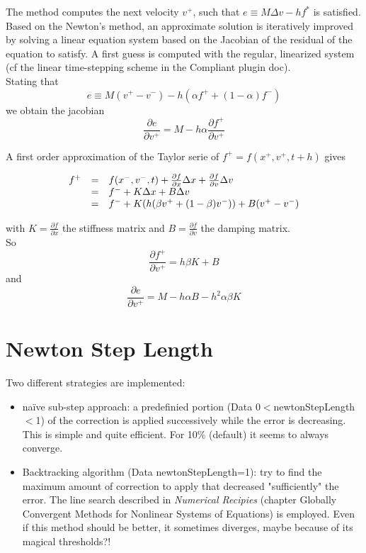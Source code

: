 \documentclass{article}
\newcommand{\ddd}[2]{\frac{\partial #1}{\partial #2}}
\newcommand{\p}[1]{#1^{+}}
\newcommand{\m}[1]{#1^{-}}
\newcommand{\s}[1]{#1^{*}}
\newcommand{\xp}{\p{x}}
\newcommand{\xm}{\m{x}}
\newcommand{\vp}{\p{v}}
\newcommand{\vm}{\m{v}}
\newcommand{\fp}{\p{f}}
\newcommand{\fm}{\m{f}}
\newcommand{\fs}{\s{f}}
\newcommand{\Dx}{\Delta x}
\newcommand{\Dv}{\Delta v}
\begin{document}
The method computes the next velocity $\vp$, such that $e \equiv M\Dv-h\fs$ is satisfied.\\


Based on the Newton's method, an approximate solution is iteratively improved by solving a linear equation system based on the Jacobian of the residual of the equation to satisfy.
A first guess is computed with the regular, linearized system (cf the linear time-stepping scheme in the Compliant plugin doc). \\


Stating that \[ e \equiv M(\vp-\vm)-h(\alpha\fp+(1-\alpha)\fm)\] we obtain the jacobian \[ \ddd{e}{\vp}=M-h\alpha\ddd{\fp}{\vp}\]

A first order approximation of the Taylor serie of $\fp=f(\xp,\vp,t+h)$ gives

\[
   \begin{array}{r c l}
      \fp  & = & f(\xm,\vm,t)+\ddd{f}{x}\Dx+\ddd{f}{v}\Dv \\
           & = & \fm+K\Dx+B\Dv \\
           & = & \fm+K(h(\beta\vp+(1-\beta)\vm))+B(\vp-\vm)
   \end{array}
\]

with $K=\ddd{f}{x}$ the stiffness matrix and $B=\ddd{f}{v}$ the damping matrix. \\


So \[ \ddd{\fp}{\vp}=h\beta K+B\] and \[\ddd{e}{\vp}=M-h\alpha B-h^2\alpha\beta K\]


\section{Newton Step Length}

Two different strategies are implemented:
\begin{itemize}
\item naïve sub-step approach: a predefinied portion (Data 0$<$newtonStepLength$<$1) of the correction is applied successively while the error is decreasing. This is simple and quite efficient. For 10\% (default) it seems to always converge.
\item Backtracking algorithm (Data newtonStepLength=1): try to find the maximum amount of correction to apply that decreased "sufficiently" the error. The line search described in \textit{Numerical Recipies} (chapter Globally Convergent Methods for Nonlinear Systems of Equations) is employed. Even if this method should be better, it sometimes diverges, maybe because of its magical thresholds?!
\end{itemize}
\end{document}
